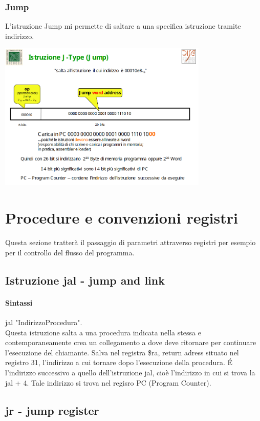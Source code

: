 \documentclass[12pt, a4paper, openany]{book}
\begin{document}
\subsubsection*{Jump}
L'istruzione Jump mi permette di saltare a una specifica istruzione tramite indirizzo.
\begin{center}
    \includegraphics[width=100mm, scale=0.5]{jump.png}
\end{center}

\section{Procedure e convenzioni registri}
Questa sezione tratterà il passaggio di parametri attraverso registri per esempio
per il controllo del flusso del programma.

\subsection*{Istruzione jal - jump and link}
\paragraph*{Sintassi} jal "IndirizzoProcedura".
\\ Questa istruzione salta a una procedura indicata nella stessa e contemporaneamente
crea un collegamento a dove deve ritornare per continuare l'esecuzione del chiamante.
Salva nel registra \$ra, return adress situato nel registro 31, l'indirizzo a cui tornare
dopo l'esecuzione della procedura.
\'E l'indirizzo successivo a quello dell'istruzione jal, cioè l'indirizzo in cui si trova
la jal + 4. Tale indirizzo si trova nel regisro PC (Program Counter). 

\subsection*{jr - jump register}
\end{document}
